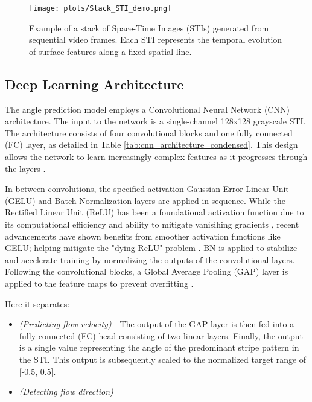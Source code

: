 \documentclass[12pt]{elsarticle}
\begin{document}
\begin{figure}[!htbp]
    \centering
    \texttt{[image: plots/Stack\_STI\_demo.png]}
    \caption{Example of a stack of Space-Time Images (STIs) generated from sequential video frames. Each STI represents the temporal evolution of surface features along a fixed spatial line.}
    \label{fig:stack_sti_demo}
\end{figure}

\subsection{Deep Learning Architecture}
The angle prediction model employs a Convolutional Neural Network (CNN) architecture. The input to the network is a single-channel 128x128 grayscale STI. The architecture consists of four convolutional blocks and one fully connected (FC) layer, as detailed in Table \ref{tab:cnn_architecture_condensed}. This design allows the network to learn increasingly complex features as it progresses through the layers \cite{zeiler2014visualizing}.

In between convolutions, the specified activation Gaussian Error Linear Unit (GELU) and Batch Normalization layers are applied in sequence. While the Rectified Linear Unit (ReLU) has been a foundational activation function due to its computational efficiency and ability to mitigate vanisihing gradients \cite{pmlr-v15-glorot11a}, recent advancements have shown benefits from smoother activation functions like GELU; helping mitigate the "dying ReLU" problem \cite{hendrycks2016GELU, lu2019dying}. BN is applied to stabilize and accelerate training \cite{ioffe2015batch} by normalizing the outputs of the convolutional layers. Following the convolutional blocks, a Global Average Pooling (GAP) layer is applied to the feature maps to prevent overfitting \cite{lin2013GAP, watanabe2021improving}. 

Here it separates:
\begin{itemize}
    \item \textit{(Predicting flow velocity)} - The output of the GAP layer is then fed into a fully connected (FC) head consisting of two linear layers. Finally, the output is a single value representing the angle of the predominant stripe pattern in the STI. This output is subsequently scaled to the normalized target range of [-0.5, 0.5].
    \item \textit{(Detecting flow direction)}
\end{itemize}
\end{document}
